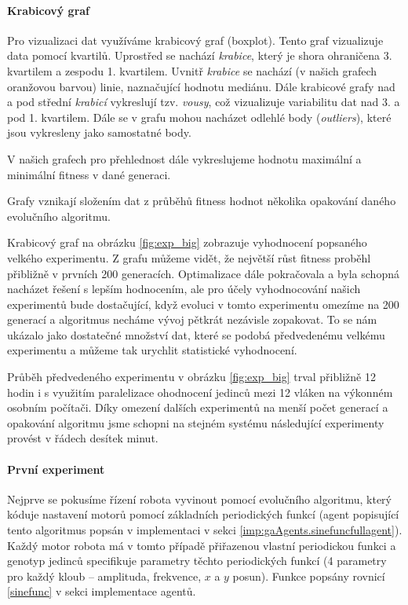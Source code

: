 \paragraph{Krabicový graf}
Pro vizualizaci dat využíváme krabicový graf (boxplot). Tento graf vizualizuje
data pomocí kvartilů. Uprostřed se nachází \emph{krabice}, který je shora
ohraničena 3. kvartilem a zespodu 1. kvartilem. Uvnitř \emph{krabice} se
nachází (v našich grafech oranžovou barvou) linie, naznačující hodnotu mediánu.
Dále krabicové grafy nad a pod střední \emph{krabicí} vykreslují tzv.
\emph{vousy}, což vizualizuje variabilitu dat nad 3. a pod 1. kvartilem. Dále
se v grafu mohou nacházet odlehlé body (\emph{outliers}), které jsou vykresleny
jako samostatné body.

V našich grafech pro přehlednost dále vykreslujeme hodnotu maximální a
minimální fitness v dané generaci.

Grafy vznikají složením dat z průběhů fitness hodnot několika opakování daného
evolučního algoritmu.

Krabicový graf na obrázku \ref{fig:exp_big} zobrazuje vyhodnocení popsaného
velkého experimentu. Z grafu můžeme vidět, že největší růst fitness proběhl
přibližně v prvních 200 generacích. Optimalizace dále pokračovala a byla
schopná nacházet řešení s lepším hodnocením, ale pro účely vyhodnocování našich 
experimentů bude dostačující, když evoluci v tomto experimentu omezíme na 200
generací a algoritmus necháme vývoj pětkrát nezávisle zopakovat. To se nám
ukázalo jako dostatečné množství dat, které se podobá předvedenému velkému
experimentu a můžeme tak urychlit statistické vyhodnocení. 

Průběh předvedeného experimentu v obrázku \ref{fig:exp_big} trval přibližně 12
hodin i s využitím paralelizace ohodnocení jedinců mezi 12 vláken na výkonném
osobním počítači. Díky omezení dalších experimentů na menší počet generací a
opakování algoritmu jsme schopni na stejném systému následující experimenty
provést v řádech desítek minut.

\paragraph{První experiment}
Nejprve se pokusíme řízení robota vyvinout pomocí evolučního
algoritmu, který kóduje nastavení motorů pomocí základních periodických funkcí
(agent popisující tento algoritmus popsán v implementaci v sekci
\ref{imp:gaAgents.sinefuncfullagent}). Každý motor robota má v tomto případě
přiřazenou vlastní periodickou funkci a genotyp jedinců specifikuje parametry
těchto periodických funkcí (4 parametry pro každý kloub -- amplituda,
frekvence, $x$ a $y$ posun). Funkce popsány rovnicí \ref{sinefunc} v sekci
implementace agentů.

